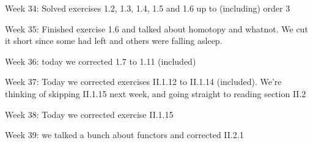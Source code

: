 Week 34: Solved exercises 1.2, 1.3, 1.4, 1.5 and 1.6 up to (including) order 3

Week 35: Finished exercise 1.6 and talked about homotopy and whatnot. We cut it short since some had left and others were falling asleep.

Week 36: today we corrected 1.7 to 1.11 (included)

Week 37: Today we corrected exercises II.1.12 to II.1.14 (included). We're thinking of skipping II.1.15 next week, and going straight to reading section II.2

Week 38: Today we corrected exercise II.1.15

Week 39: we talked a bunch about functors and corrected II.2.1

\newpage
